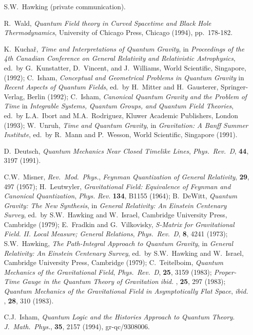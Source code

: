\begin{references}
 S.W.~Hawking (private communication).

 R.~Wald, {\it Quantum Field theory in Curved Spacetime
and Black Hole Thermodynamics}, University of Chicago Press, Chicago
(1994), pp.~178-182.

 K.~Kucha\v r, {\it Time and Interpretations of Quantum
Gravity}, in {\sl Proceedings of the 4th Canadian
Conference on General Relativity and Relativistic Astrophysics}, ed.~by
G.~Kunstatter, D.~Vincent, and J.~Williams, World Scientific, Singapore,
(1992); C.~Isham, {\it Conceptual and Geometrical Problems in Quantum
Gravity} in {\sl Recent Aspects of Quantum Fields},
ed.~by H.~Mitter and H.~Gausterer, Springer-Verlag, Berlin (1992);
C.~Isham, {\it Canonical Quantum Gravity and the Problem of Time}
in {\sl Integrable Systems, Quantum Groups,
and Quantum Field Theories}, ed.~by L.A.~Ibort and M.A.~Rodriguez,
Kluwer Academic Publishers, London (1993);
W.~Unruh, {\it Time and Quantum Gravity},
in {\sl Gravitation: A Banff Summer Institute},
ed.~by R.~Mann and P.~Wesson, World Scientific, Singapore (1991).

 D.~Deutsch, {\it  Quantum Mechanics Near Closed Timelike
Lines}, {\sl Phys.~Rev.~D}, {\bf 44}, 3197 (1991).

 C.W.~Misner, {\sl Rev.~Mod.~Phys.}, {\it Feynman
Quantization of General Relativity}, {\bf 29}, 497 (1957);
H.~Leutwyler, {\it Gravitational Field: Equivalence of Feynman and
Canonical Quantization}, {\sl Phys. Rev.} {\bf 134}, B1155 (1964); B.~DeWitt,
{\it Quantum Gravity: The New Synthesis},  in
{\sl General Relativity: An Einstein
Centenary Survey}, ed.~by S.W.~Hawking and W.~Israel, Cambridge
University Press, Cambridge (1979); E.~Fradkin and G.~Vilkovisky,
{\it S-Matrix for Gravitational
 Field. II. Local Measure; General Relations},
{\sl Phys.~Rev.~D}, {\bf 8},
4241 (1973); S.W.~Hawking, {\it The Path-Integral Approach to Quantum
Gravity}, in {\sl General Relativity: An Einstein
Centenary
Survey}, ed.~by S.W.~Hawking and W.~Israel, Cambridge University Press,
Cambridge (1979); C.~Teitelboim, {\it Quantum Mechanics of the Gravitational
 Field},  {\sl Phys.~Rev.~D}, {\bf 25}, 3159
(1983);  {\it Proper-Time Gauge in the Quantum Theory of Gravitation}
{ \sl ibid.       }, {\bf 25}, 297 (1983); 
  {\it Quantum Mechanics of the Gravitational Field in Asymptotically Flat
Space}, {\sl ibid.       }, {\bf 28}, 310 (1983).



 C.J.~Isham, {\sl Quantum Logic and the Histories
Approach
to Quantum Theory}. {\sl J.~Math.~Phys.}, {\bf 35}, 2157 (1994), gr-qc/9308006.


\end{references}
